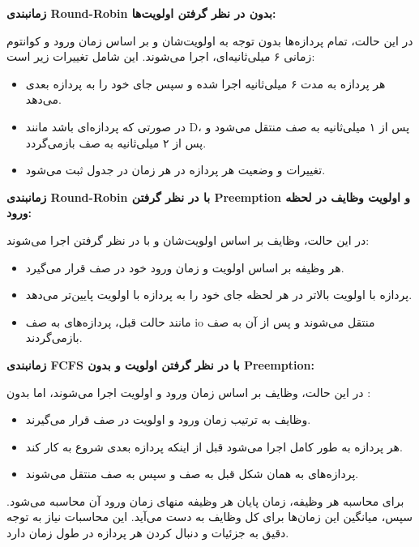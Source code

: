 \textbf{زمانبندی Round-Robin بدون در نظر گرفتن اولویت‌ها:}

در این حالت، تمام پردازه‌ها بدون توجه به اولویت‌شان و بر اساس زمان ورود و کوانتوم زمانی ۶ میلی‌ثانیه‌ای، اجرا می‌شوند. این شامل تغییرات زیر است:

\begin{itemize}
    \item هر پردازه به مدت ۶ میلی‌ثانیه اجرا شده و سپس جای خود را به پردازه بعدی می‌دهد.

    \item در صورتی که پردازه‌ای  باشد مانند D، پس از ۱ میلی‌ثانیه به صف  منتقل می‌شود و پس از ۲ میلی‌ثانیه به صف  بازمی‌گردد.

    \item تغییرات و وضعیت هر پردازه در هر زمان در جدول ثبت می‌شود.
\end{itemize}

\textbf{زمانبندی Round-Robin با در نظر گرفتن Preemption و اولویت وظایف در لحظه ورود:}

در این حالت، وظایف بر اساس اولویت‌شان و با در نظر گرفتن  اجرا می‌شوند:

\begin{itemize}
    \item هر وظیفه بر اساس اولویت و زمان ورود خود در صف  قرار می‌گیرد.

    \item پردازه با اولویت بالاتر در هر لحظه جای خود را به پردازه با اولویت پایین‌تر می‌دهد.

    \item مانند حالت قبل، پردازه‌های  به صف io منتقل می‌شوند و پس از آن به صف  بازمی‌گردند.
\end{itemize}

\textbf{زمانبندی FCFS با در نظر گرفتن اولویت و بدون Preemption:}

در این حالت، وظایف بر اساس زمان ورود و اولویت اجرا می‌شوند، اما بدون :

\begin{itemize}
    \item وظایف به ترتیب زمان ورود و اولویت در صف  قرار می‌گیرند.

    \item هر پردازه به طور کامل اجرا می‌شود قبل از اینکه پردازه بعدی شروع به کار کند.
    
    \item پردازه‌های  به همان شکل قبل به صف  و سپس به صف  منتقل می‌شوند.
\end{itemize}

برای محاسبه  هر وظیفه، زمان پایان هر وظیفه منهای زمان ورود آن محاسبه می‌شود. سپس، میانگین این زمان‌ها برای کل وظایف به دست می‌آید. این محاسبات نیاز به توجه دقیق به جزئیات و دنبال کردن هر پردازه در طول زمان دارد.